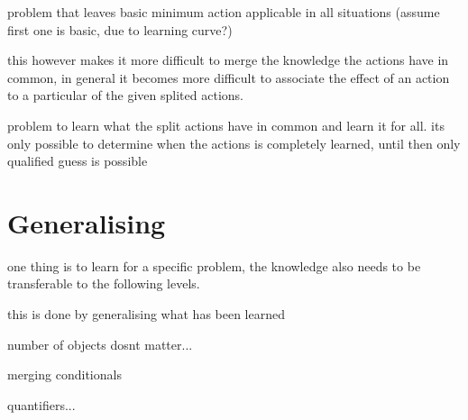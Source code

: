 	

	
	problem that leaves basic minimum action applicable in all situations (assume first one is basic, due to learning curve?)
	
	
	
	this however makes it more difficult to merge the knowledge the actions have in common, in general it becomes more difficult to associate the effect of an action to a particular of the given splited actions.
	
	
	problem to learn what the split actions have in common and learn it for all. its only possible to determine when the actions is completely learned, until then only qualified guess is possible
	
	
	
	
	
\section{Generalising}	
	one thing is to learn for a specific problem, the knowledge also needs to be transferable to the following levels. 
	
	this is done by generalising what has been learned
	
	
	number of objects dosnt matter...
	
	
	merging conditionals
	
	quantifiers...
	
	
	
	
	
	